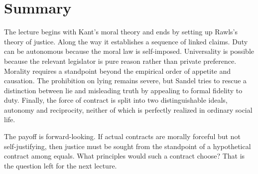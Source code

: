\section{Summary}

The lecture begins with Kant's moral theory and ends by setting up Rawls's theory of justice. Along the way it establishes a sequence of linked claims. Duty can be autonomous because the moral law is self-imposed. Universality is possible because the relevant legislator is pure reason rather than private preference. Morality requires a standpoint beyond the empirical order of appetite and causation. The prohibition on lying remains severe, but Sandel tries to rescue a distinction between lie and misleading truth by appealing to formal fidelity to duty. Finally, the force of contract is split into two distinguishable ideals, autonomy and reciprocity, neither of which is perfectly realized in ordinary social life.

The payoff is forward-looking. If actual contracts are morally forceful but not self-justifying, then justice must be sought from the standpoint of a hypothetical contract among equals. What principles would such a contract choose? That is the question left for the next lecture.
